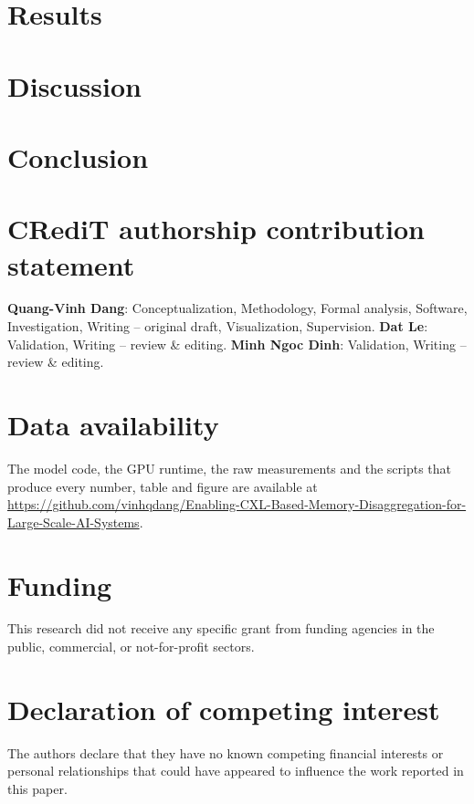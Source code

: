 \documentclass[final,5p,times,twocolumn]{elsarticle}
\theoremstyle{definition}
\begin{document}
\section{Results}
\label{sec:results}



\section{Discussion}
\label{sec:discussion}



\section{Conclusion}
\label{sec:conclusion}



\section*{CRediT authorship contribution statement}
\textbf{Quang-Vinh Dang}: Conceptualization, Methodology, Formal analysis, Software, Investigation, Writing -- original draft, Visualization, Supervision. \textbf{Dat Le}: Validation, Writing -- review \& editing. \textbf{Minh Ngoc Dinh}: Validation, Writing -- review \& editing.

\section*{Data availability}
The model code, the GPU runtime, the raw measurements and the scripts that produce every number, table and figure are available at \url{https://github.com/vinhqdang/Enabling-CXL-Based-Memory-Disaggregation-for-Large-Scale-AI-Systems}.

\section*{Funding}
This research did not receive any specific grant from funding agencies in the public, commercial, or not-for-profit sectors.

\section*{Declaration of competing interest}
The authors declare that they have no known competing financial interests or personal relationships that could have appeared to influence the work reported in this paper.
\end{document}
